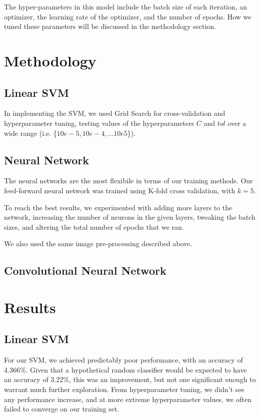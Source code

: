 \documentclass[conference]{IEEEtran}
\begin{document}
The hyper-parameters in this model include the batch size of each iteration, an optimizer, the learning rate of the optimizer, and the number of epochs. How we tuned these parameters will be discussed in the methodology section.

\section{\textbf{Methodology}}

\subsection{Linear SVM}

In implementing the SVM, we used Grid Search for cross-validation and hyperparameter tuning, testing values of the hyperparameters $C$ and $tol$ over a wide range (i.e. \{$10e-5, 10e-4, \ldots 10e5$\}).

\subsection{Neural Network}

The neural networks are the most flexibile in terms of our training methods. Our feed-forward neural network was trained using K-fold cross validation, with $k = 5$.

To reach the best results, we experimented with adding more layers to the network, increasing the number of neurons in the given layers, tweaking the batch sizes, and altering the total number of epochs that we ran.

We also used the same image pre-processing described above.

\subsection{Convolutional Neural Network}


\section{\textbf{Results}}

\subsection{Linear SVM}

For our SVM, we achieved predictably poor performance, with an accuracy of 4.366\%. Given that a hypothetical random classifier would be expected to have an accuracy of 3.22\%, this was an improvement, but not one significant enough to warrant much further exploration. From hyperparameter tuning, we didn't see any performance increase, and at more extreme hyperparameter values, we often failed to converge on our training set.
\end{document}
